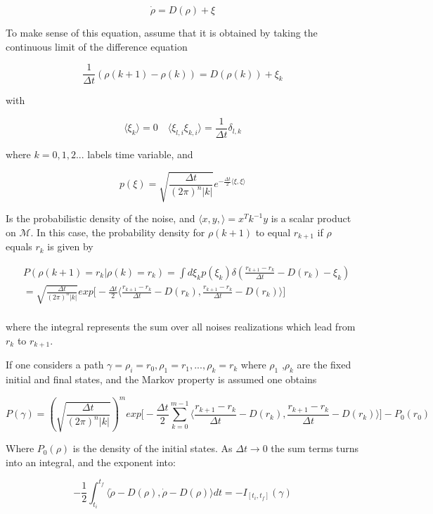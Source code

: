 \documentclass{article}
\begin{document}
\begin{equation}
\dot{\rho} = D(\rho) + \xi
\end{equation}

To make sense of this equation, assume that it is obtained by taking the continuous limit of the difference equation

$$ \frac{1}{\Delta t} (\rho(k+1) - \rho(k)) = D(\rho(k)) + \xi_k$$

with

$$ \langle \xi_k \rangle = 0 \quad \langle \xi_{l,i} \xi_{k,i} \rangle =  \frac{1}{\Delta t} \delta_{l,k} $$

where $k=0,1,2...$ labels time variable, and

$$ p(\xi) = \sqrt{ \frac{\Delta t}{(2 \pi)^n |k|} } e^{- \frac{\Delta t}{2} \langle \xi, \xi \rangle }$$

Is the probabilistic density of the noise, and $\langle x,y, \rangle = x^T k^{-1} y$ is a scalar product on $\mathcal{M}$. In this case, the probability density for $\rho(k+1)$ to equal $r_{k+1}$ if $\rho$ equals $r_k$ is given by

\begin{align}
& P(\rho(k+1)=r_k | \rho(k)=r_k) = \int d\xi_k p(\xi_k) \delta( \frac{ r_{k+1} -r_k}{\Delta t} - D(r_k) - \xi_k) \\
& = \sqrt{ \frac{\Delta t}{(2 \pi)^n |k|} } exp \Big [- \frac{\Delta t}{2} \langle  \frac{ r_{k+1} -r_k}{\Delta t} - D(r_k),  \frac{ r_{k+1} -r_k}{\Delta t} - D(r_k) \rangle \Big ] \\
\end{align}

where the integral represents the sum over all noises realizations which lead from $r_k$ to $r_{k+1}$.

If one considers a path $\gamma = {\rho_i = r_0, \rho_1 = r_1,...,\rho_k=r_k}$ where $\rho_1$ ,$\rho_k$ are the fixed initial and final states, and the Markov property is assumed one obtains

$$ P(\gamma) = (\sqrt{ \frac{\Delta t}{(2 \pi)^n |k|} })^m exp \Big [- \frac{\Delta t}{2} \sum_{k=0}^{m-1}\langle \frac{ r_{k+1} -r_k}{\Delta t} - D(r_k),  \frac{ r_{k+1} -r_k}{\Delta t} - D(r_k) \rangle \Big ]- P_0(r_0)$$

Where $P_0(\rho)$ is the density of the initial states. As $\Delta t \to 0$ the sum terms turns into an integral, and the exponent into:

$$ -\frac{1}{2} \int_{t_i}^{t_f} \langle \dot{\rho} -D(\rho),\dot{\rho}-D(\rho) \rangle dt = - I_{[t_i,t_f]}(\gamma)$$
\end{document}

